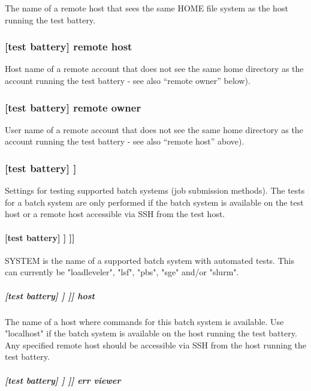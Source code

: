The name of a remote host that sees the same HOME file system as the host running the
test battery.

\subsubsection[remote host]{[test battery] \textrightarrow remote host}

Host name of a remote account that does not see the same home directory as
the account running the test battery - see also ``remote owner'' below).

\subsubsection[remote owner]{[test battery] \textrightarrow remote owner}

User name of a remote account that does not see the same home directory as the
account running the test battery - see also ``remote host'' above).

\subsubsection[{[[}batch systems{]]}]{[test battery] \textrightarrow [[batch systems]]}

Settings for testing supported batch systems (job submission methods). The
tests for a batch system are only performed if the batch system is available on
the test host or a remote host accessible via SSH from the test host.

\paragraph[{[[[}SYSTEM{]]]}]{[test battery] \textrightarrow [[batch systems]] \textrightarrow [[[SYSTEM]]]}

SYSTEM is the name of a supported batch system with automated tests.
This can currently be "loadleveler", "lsf", "pbs", "sge" and/or "slurm".

\subparagraph[host]{[test battery] \textrightarrow [[batch systems]] \textrightarrow [[[SYSTEM]]] \textrightarrow host}

The name of a host where commands for this batch system is available. Use
"localhost" if the batch system is available on the host running the test
battery. Any specified remote host should be accessible via SSH from the host
running the test battery.

\subparagraph[err viewer]{[test battery] \textrightarrow [[batch systems]] \textrightarrow [[[SYSTEM]]] \textrightarrow err viewer}

